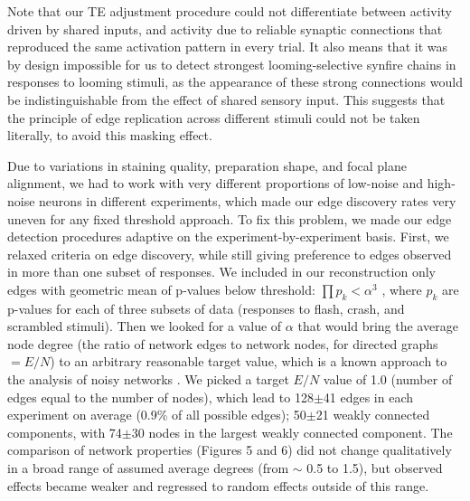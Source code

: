 \documentclass{article}
\begin{document}
Note that our TE adjustment procedure could not differentiate between activity driven by shared inputs, and activity due to reliable synaptic connections that reproduced the same activation pattern in every trial. It also means that it was by design impossible for us to detect strongest looming-selective synfire chains in responses to looming stimuli, as the appearance of these strong connections would be indistinguishable from the effect of shared sensory input. This suggests that the principle of edge replication across different stimuli could not be taken literally, to avoid this masking effect.

Due to variations in staining quality, preparation shape, and focal plane alignment, we had to work with very different proportions of low-noise and high-noise neurons in different experiments, which made our edge discovery rates very uneven for any fixed threshold approach. To fix this problem, we made our edge detection procedures adaptive on the experiment-by-experiment basis. First, we relaxed criteria on edge discovery, while still giving preference to edges observed in more than one subset of responses. We included in our reconstruction only edges with geometric mean of p-values below threshold: $\prod{p_k}<\alpha^3$ , where $p_k$ are p-values for each of three subsets of data (responses to flash, crash, and scrambled stimuli). Then we looked for a value of $\alpha$ that would bring the average node degree (the ratio of network edges to network nodes, for directed graphs $=E/N$) to an arbitrary reasonable target value, which is a known approach to the analysis of noisy networks \citep{stetter2012te}. We picked a target $E/N$ value of 1.0 (number of edges equal to the number of nodes), which lead to 128$\pm$41 edges in each experiment on average (0.9\% of all possible edges); 50$\pm$21 weakly connected components, with 74$\pm$30 nodes in the largest weakly connected component. The comparison of network properties (Figures 5 and 6) did not change qualitatively in a broad range of assumed average degrees (from $\sim$ 0.5 to 1.5), but observed effects became weaker and regressed to random effects outside of this range. 
\end{document}
